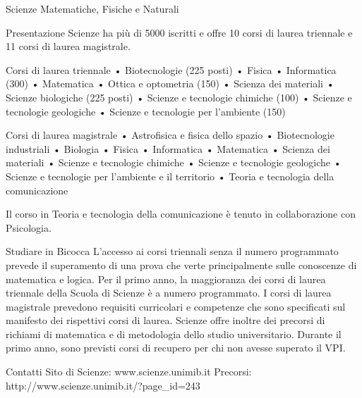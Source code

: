 Scienze Matematiche, Fisiche e Naturali

Presentazione
Scienze ha più di 5000 iscritti e offre 10 corsi di laurea triennale e 11 corsi di laurea magistrale.

Corsi di laurea triennale
     • Biotecnologie (225 posti) 
     • Fisica 
     • Informatica (300)
     • Matematica 
     • Ottica e optometria (150) 
     • Scienza dei materiali 
     • Scienze biologiche (225 posti) 
     • Scienze e tecnologie chimiche (100) 
     • Scienze e tecnologie geologiche 
     • Scienze e tecnologie per l'ambiente (150)

Corsi di laurea magistrale
     • Astrofisica e fisica dello spazio 
     • Biotecnologie industriali 
     • Biologia 
     • Fisica 
     • Informatica 
     • Matematica 
     • Scienza dei materiali 
     • Scienze e tecnologie chimiche 
     • Scienze e tecnologie geologiche 
     • Scienze e tecnologie per l'ambiente e il territorio 
     • Teoria e tecnologia della comunicazione 

Il corso in Teoria e tecnologia della comunicazione è tenuto in collaborazione con Psicologia. 

Studiare in Bicocca
L'accesso ai corsi triennali senza il numero programmato prevede il superamento di una prova che verte principalmente sulle conoscenze di matematica e logica. Per il primo anno, la maggioranza dei corsi di laurea triennale della Scuola di Scienze è a numero programmato. I corsi di laurea magistrale prevedono requisiti curricolari e competenze che sono specificati sul manifesto dei rispettivi corsi di laurea. 
Scienze offre inoltre dei precorsi di richiami di matematica e di metodologia dello studio universitario. Durante il primo anno, sono previsti corsi di recupero per chi non avesse superato il VPI. 

Contatti
Sito di Scienze: www.scienze.unimib.it 
Precorsi: http://www.scienze.unimib.it/?page_id=243
